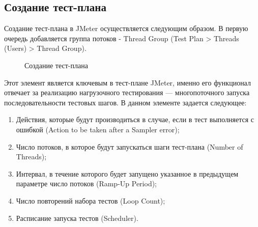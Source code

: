 \subsection{Создание тест-плана}

Создание тест-плана в JMeter осуществляется следующим образом.
В первую очередь добавляется группа потоков - Thread Group (Test Plan > Threads (Users) > Thread Group).

\begin{figure}[ht]
\caption{Создание тест-плана}
\label{ris:testplan.png}
\end{figure}

Этот элемент является ключевым в тест-плане JMeter, именно его функционал отвечает за реализацию
нагрузочного тестирования --- многопоточного запуска последовательности тестовых шагов.
В данном элементе задается следующее:

\begin{enumerate}
\item Действия, которые будут производиться в случае, если в тест выполняется с ошибкой
(Action to be taken after a Sampler error);
\item Число потоков, в которое будут запускаться шаги тест-плана (Number of Threads);
\item Интервал, в течение которого будет запущено указанное в предыдущем параметре
число потоков (Ramp-Up Period);
\item Число повторений набора тестов (Loop Count);
\item Расписание запуска тестов (Scheduler).
\end{enumerate}

